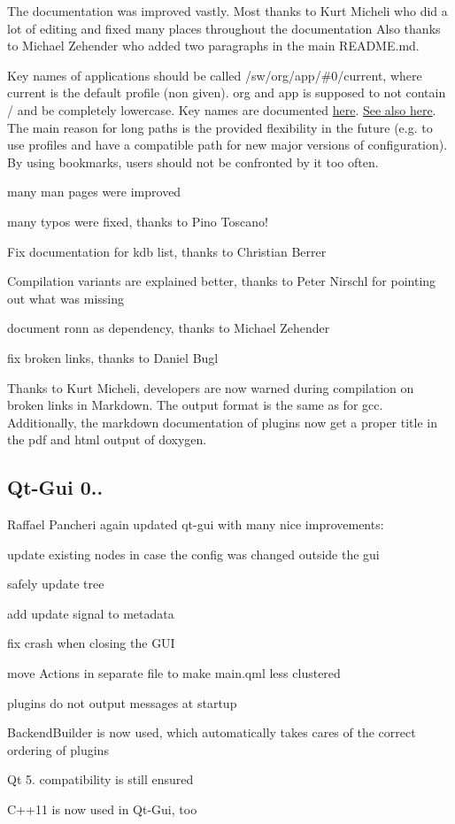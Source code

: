 The documentation was improved vastly. Most thanks to Kurt Micheli who did a lot of editing and fixed many places throughout the documentation Also thanks to Michael Zehender who added two paragraphs in the main R\+E\+A\+D\+M\+E.\+md.

Key names of applications should be called {\ttfamily /sw/org/app/\#0/current}, where {\ttfamily current} is the default profile (non given). {\ttfamily org} and {\ttfamily app} is supposed to not contain {\ttfamily /} and be completely lowercase. Key names are documented \hyperlink{doc_help_elektra-key-names_md}{here}. \hyperlink{doc_tutorials_application-integration_md}{See also here}. The main reason for long paths is the provided flexibility in the future (e.\+g. to use profiles and have a compatible path for new major versions of configuration). By using bookmarks, users should not be confronted by it too often.


\begin{DoxyItemize}
\item many man pages were improved
\item many typos were fixed, thanks to Pino Toscano!
\item Fix documentation for kdb list, thanks to Christian Berrer
\item Compilation variants are explained better, thanks to Peter Nirschl for pointing out what was missing
\item document ronn as dependency, thanks to Michael Zehender
\item fix broken links, thanks to Daniel Bugl
\end{DoxyItemize}

Thanks to Kurt Micheli, developers are now warned during compilation on broken links in Markdown. The output format is the same as for gcc. Additionally, the markdown documentation of plugins now get a proper title in the pdf and html output of doxygen.

\subsection*{Qt-\/\+Gui 0..}

Raffael Pancheri again updated qt-\/gui with many nice improvements\+:


\begin{DoxyItemize}
\item update existing nodes in case the config was changed outside the gui
\item safely update tree
\item add update signal to metadata
\item fix crash when closing the G\+UI
\item move Actions in separate file to make main.\+qml less clustered
\item plugins do not output messages at startup
\item {\ttfamily Backend\+Builder} is now used, which automatically takes cares of the correct ordering of plugins
\item Qt 5. compatibility is still ensured
\item C++11 is now used in Qt-\/\+Gui, too
\end{DoxyItemize}

